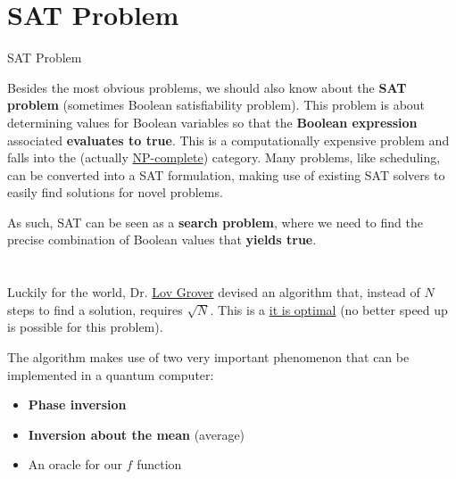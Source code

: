 \documentclass[aspectratio=43]{beamer}
\begin{document}
\section{SAT Problem}
\begin{frame}{SAT Problem}
    \begin{card}
        \small{Besides the most obvious problems, we should also know about the \textbf{SAT problem} (sometimes Boolean satisfiability problem). This problem is about determining values for Boolean variables so that the \textbf{Boolean expression} associated \textbf{evaluates to true}. This is a computationally expensive problem and falls into the \np (actually \href{https://en.wikipedia.org/wiki/NP-completeness}{NP-complete}) category. Many problems, like scheduling, can be converted into a SAT formulation, making use of existing SAT solvers to easily find solutions for novel problems.}
    \end{card}
    \begin{card}
        \small{As such, SAT can be seen as a \textbf{search problem}, where we need to find the precise combination of Boolean values that \textbf{yields true}.}
    \end{card}
\pagenumber
\end{frame}

\section{\gvsa} %
\begin{frame}{\gvsa}
    \begin{card}
        Luckily for the world, Dr. \href{https://en.wikipedia.org/wiki/Lov_Grover}{Lov Grover} devised an algorithm that, instead of $N$ steps to find a solution, requires $\sqrt{N}$. This is a \href{https://arxiv.org/abs/quant-ph/9711070}{it is optimal} (no better speed up is possible for this problem). 
    \end{card}
    \begin{card}
        The algorithm makes use of two very important phenomenon that can be implemented in a quantum computer:\begin{itemize}
            \item \textbf{Phase inversion}
            \item \textbf{Inversion about the mean} (average)
            \item An oracle for our $f$ function
        \end{itemize}
    \end{card}
\pagenumber
\end{frame}
\end{document}
